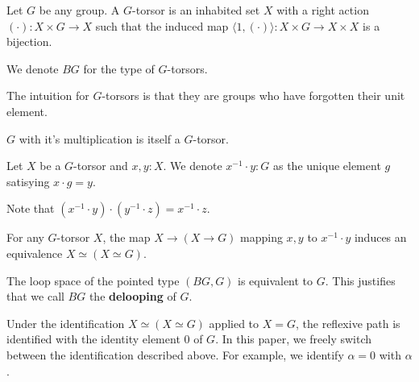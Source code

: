 \begin{definition}
  Let $G$ be any group. 
  A $G$-torsor is an inhabited set $X$ with a right action 
  $(\cdot): X \times G \to X$ such that the induced map 
  $\langle 1 , (\cdot)\rangle : X \times G \to X \times X$ 
  is a bijection. 

  We denote $BG$ for the type of $G$-torsors.
\end{definition}
The intuition for $G$-torsors is that they are groups who have forgotten their unit element. 
\begin{example}
  $G$ with it's multiplication is itself a $G$-torsor. 
\end{example}
\begin{definition}
  Let $X$ be a $G$-torsor and $x,y:X$. We denote $x^{-1}\cdot y:G$ as the unique element $g$ satisying $x\cdot g = y$. 
\end{definition}
\begin{remark}
  Note that $(x^{-1} \cdot y) \cdot (y^{-1} \cdot z) = x^{-1} \cdot z$. 
\end{remark}
\begin{remark}
  For any $G$-torsor $X$, the map $X \to (X \to G)$ mapping $x,y$ to $x^{-1}\cdot y$ induces an equivalence $X \simeq (X \simeq G)$.
\end{remark}
\begin{corollary}
  The loop space of the pointed type $(BG,G)$ is equivalent to $G$. This justifies that we call $BG$ the \textbf{delooping} of $G$. 
\end{corollary}
\begin{remark}
Under the identification $X \simeq (X \simeq G)$ applied to $X = G$, the reflexive path is identified with the identity element $0$ of $G$. In this paper, we freely switch between the identification described above. For example, we identify $\alpha = 0$ with $\alpha$.
\end{remark}


